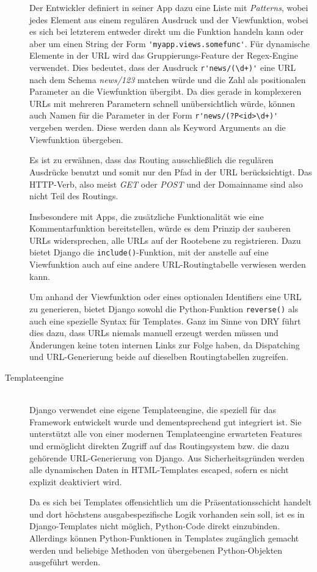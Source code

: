 \begin{description}
Der Entwickler definiert in seiner App dazu eine Liste mit \emph{Patterns}, wobei jedes Element aus
einem regulären Ausdruck und der Viewfunktion, wobei es sich bei letzterem entweder direkt um die
Funktion handeln kann oder aber um einen String der Form \lstinline{'myapp.views.somefunc'}. Für
dynamische Elemente in der URL wird das Gruppierungs-Feature der Regex-Engine verwendet. Dies
bedeutet, dass der Ausdruck \lstinline{r'news/(\d+)'} eine URL nach dem Schema \emph{news/123}
matchen würde und die Zahl als positionalen Parameter an die Viewfunktion übergibt. Da dies gerade
in komplexeren URLs mit mehreren Parametern schnell unübersichtlich würde, können auch Namen für die
Parameter in der Form \lstinline{r'news/(?P<id>\d+)'} vergeben werden. Diese werden dann als Keyword
Arguments an die Viewfunktion übergeben.

Es ist zu erwähnen, dass das Routing ausschließlich die regulären Ausdrücke benutzt und somit nur
den Pfad in der URL berücksichtigt. Das HTTP-Verb, also meist \emph{GET} oder \emph{POST} und der
Domainname sind also nicht Teil des Routings.

Insbesondere mit Apps, die zusätzliche Funktionalität wie eine Kommentarfunktion
bereitstellen, würde es dem Prinzip der sauberen URLs widersprechen, alle URLs auf der Rootebene zu
registrieren. Dazu bietet Django die \lstinline{include()}-Funktion, mit der anstelle auf eine
Viewfunktion auch auf eine andere URL-Routingtabelle verwiesen werden kann.

Um anhand der Viewfunktion oder eines optionalen Identifiers eine URL zu generieren, bietet Django
sowohl die Python-Funktion \lstinline{reverse()} als auch eine spezielle Syntax für Templates. Ganz
im Sinne von DRY führt dies dazu, dass URLs niemals manuell erzeugt werden müssen und Änderungen
keine toten internen Links zur Folge haben, da Dispatching und URL-Generierung beide auf dieselben
Routingtabellen zugreifen.


\item[Templateengine] \hfill \\
Django verwendet eine eigene Templateengine, die speziell für das Framework entwickelt wurde und
dementsprechend gut integriert ist. Sie unterstützt alle von einer modernen Templateengine
erwarteten Features und ermöglicht direkten Zugriff auf das Routingsystem bzw. die dazu gehörende
URL-Generierung von Django. Aus Sicherheitsgründen werden alle dynamischen Daten in HTML-Templates
escaped, sofern es nicht explizit deaktiviert wird.

Da es sich bei Templates offensichtlich um die Präsentationsschicht handelt und dort höchstens
ausgabespezifische Logik vorhanden sein soll, ist es in Django-Templates nicht möglich, Python-Code
direkt einzubinden. Allerdings können Python-Funktionen in Templates zugänglich gemacht werden und
beliebige Methoden von übergebenen Python-Objekten ausgeführt werden.


\end{description}
